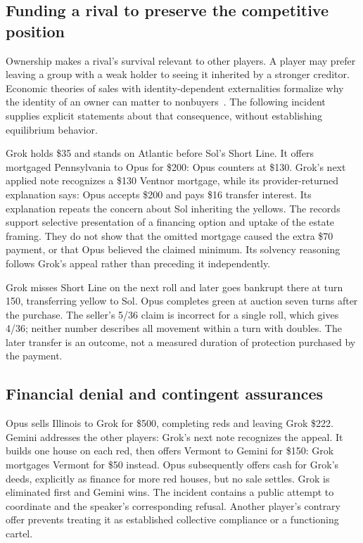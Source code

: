 \subsection{Funding a rival to preserve the competitive position}
Ownership makes a rival's survival relevant to other players. A player may prefer leaving a group with a weak holder to seeing it inherited by a stronger creditor. Economic theories of sales with identity-dependent externalities formalize why the identity of an owner can matter to nonbuyers~\cite{jehiel1996externalities}. The following incident supplies explicit statements about that consequence, without establishing equilibrium behavior.

Grok holds \$35 and stands on Atlantic before Sol's Short Line. It offers mortgaged Pennsylvania to Opus for \$200:
Opus counters at \$130. Grok's next applied note recognizes a \$130 Ventnor mortgage, while its provider-returned explanation says:
Opus accepts \$200 and pays \$16 transfer interest. Its explanation repeats the concern about Sol inheriting the yellows. The records support selective presentation of a financing option and uptake of the estate framing. They do not show that the omitted mortgage caused the extra \$70 payment, or that Opus believed the claimed minimum. Its solvency reasoning follows Grok's appeal rather than preceding it independently.

Grok misses Short Line on the next roll and later goes bankrupt there at turn 150, transferring yellow to Sol. Opus completes green at auction seven turns after the purchase. The seller's 5/36 claim is incorrect for a single roll, which gives 4/36; neither number describes all movement within a turn with doubles. The later transfer is an outcome, not a measured duration of protection purchased by the payment.

\subsection{Financial denial and contingent assurances}
Opus sells Illinois to Grok for \$500, completing reds and leaving Grok \$222. Gemini addresses the other players:
Grok's next note recognizes the appeal. It builds one house on each red, then offers Vermont to Gemini for \$150:
Grok mortgages Vermont for \$50 instead. Opus subsequently offers cash for Grok's deeds, explicitly as finance for more red houses, but no sale settles. Grok is eliminated first and Gemini wins. The incident contains a public attempt to coordinate and the speaker's corresponding refusal. Another player's contrary offer prevents treating it as established collective compliance or a functioning cartel.

